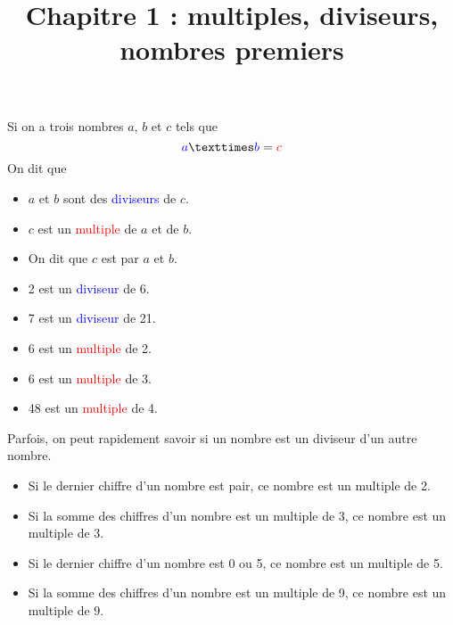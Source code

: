 \documentclass[a4paper]{article}
\title{Chapitre 1 : multiples, diviseurs, nombres premiers}
\date{}
\author{}
\begin{document}
\maketitle

\begin{cours}
	Si on a trois nombres $a$, $b$ et $c$ tels que
	$$ \textcolor{blue}{a} × \textcolor{blue}{b} = \textcolor{red}{c} $$
	On dit que
	\begin{itemize}
		\setlength\itemsep{0.3em}
		\item $a$ et $b$ sont des \textcolor{blue}{diviseurs} de $c$.
		\item $c$ est un \textcolor{red}{multiple} de $a$ et de $b$.
		\item On dit que $c$ est  par $a$ et $b$.
	\end{itemize}
\end{cours}

\begin{exemple}
	\begin{itemize}
		\setlength\itemsep{0.3em}
		\item 2 est un \textcolor{blue}{diviseur} de 6.
		\item 7 est un \textcolor{blue}{diviseur} de 21.
		\item 6 est un \textcolor{red}{multiple} de 2.
		\item 6 est un \textcolor{red}{multiple} de 3.
		\item 48 est un \textcolor{red}{multiple} de 4.
	\end{itemize}
\end{exemple}

\begin{cours} \label{cours:criteres-de-divisibilite}
	Parfois, on peut rapidement savoir si un nombre est un diviseur d'un autre nombre. \\
	\begin{itemize}
		\setlength\itemsep{0.3em}
		\item Si le dernier chiffre d'un nombre est pair, ce nombre est un multiple de 2.
		\item Si la somme des chiffres d'un nombre est un multiple de 3, ce nombre est un multiple de 3.
		\item Si le dernier chiffre d'un nombre est 0 ou 5, ce nombre est un multiple de 5.
		\item Si la somme des chiffres d'un nombre est un multiple de 9, ce nombre est un multiple de 9.
	\end{itemize}
\end{cours}
\end{document}

